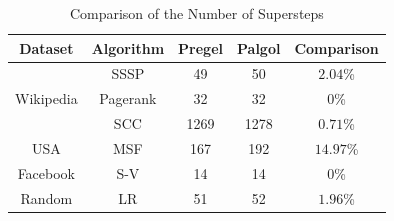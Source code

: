 \documentclass{sokendai_thesis} %
\newcommand{\plus}{\raisebox{.25ex}{\scalebox{.8}{+}}}
\begin{document}
\begin{table}[t]
 \centering
 \caption{Comparison of the Number of Supersteps}
 \label{tab:steps}
 \begin{tabular}{c|c|c|c|c}
  \hline
  \textbf{Dataset} & \textbf{Algorithm} & Pregel\protect\plus & Palgol & Comparison \\
  \hline\hline
  \multirow{3}{*}{Wikipedia} & SSSP & 49 & 50 & $2.04$\% \\
  \cline{2-5}
  & Pagerank & 32 & 32 & $0$\% \\
  \cline{2-5}
  & SCC & 1269 & 1278 & $0.71$\% \\
  \hline
  USA & MSF & 167 & 192 & $14.97$\% \\
  \hline
  Facebook & S-V & 14 & 14 & $0$\% \\
  \hline
  Random & LR & 51 & 52 & $1.96$\% \\
  \hline
 \end{tabular}
\end{table}
\end{document}
